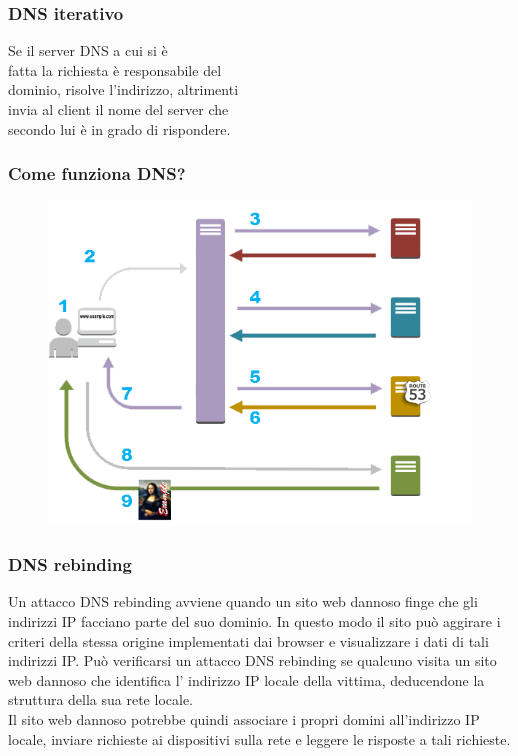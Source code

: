 \documentclass[aspectratio=169]{beamer}
\begin{document}
    \begin{frame}
        \frametitle{DNS iterativo}
        Se il server DNS a cui si è\\ fatta la richiesta è responsabile del\\ dominio, risolve l'indirizzo, altrimenti\\ invia al client il nome del server che\\ secondo lui è in grado di rispondere.
    \end{frame}
    
    \begin{frame}
        \frametitle{Come funziona DNS?}
        \begin{figure}
            \includegraphics[width=0.6\linewidth]{img/dns_resolver.png}
        \end{figure}
    \end{frame}
    
    \begin{frame}
        \frametitle{DNS rebinding}
        Un attacco DNS rebinding avviene quando un sito web dannoso finge che gli indirizzi IP facciano parte del suo dominio. In questo modo il sito può aggirare i criteri della stessa origine implementati dai browser e visualizzare i dati di tali indirizzi IP.\vskip 0.3cm
        Può verificarsi un attacco DNS rebinding se qualcuno visita un sito web dannoso che identifica l' indirizzo IP locale della vittima, deducendone la struttura della sua rete locale. 
        \\
        Il sito web dannoso potrebbe quindi associare i propri domini all'indirizzo IP locale, inviare richieste ai dispositivi sulla rete e leggere le risposte a tali richieste. 
    \end{frame}
    
\end{document}

